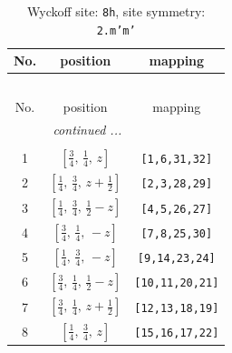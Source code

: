 \documentclass[fleqn,8pt]{jsarticle}
\begin{document}
\begin{longtable}{ccc}
\caption{Wyckoff site: {\tt 8h}, site symmetry: {\tt 2.m'm'}}
 \\
 \hline \hline
No. & position & mapping \\ \hline \endfirsthead

\multicolumn{2}{l}{\tablename\ \thetable{}} \\
 \hline \hline
No. & position & mapping \\ \hline \endhead

 \hline \hline
\multicolumn{2}{r}{\footnotesize\it continued ...} \\ \endfoot

 \hline \hline
\multicolumn{2}{r}{} \\ \endlastfoot

1 & $\left[ \frac{3}{4},\, \frac{1}{4},\, z \right]$ & {\tt [1,6,31,32]} \\ \hline
2 & $\left[ \frac{1}{4},\, \frac{3}{4},\, z + \frac{1}{2} \right]$ & {\tt [2,3,28,29]} \\ \hline
3 & $\left[ \frac{1}{4},\, \frac{3}{4},\, \frac{1}{2} - z \right]$ & {\tt [4,5,26,27]} \\ \hline
4 & $\left[ \frac{3}{4},\, \frac{1}{4},\, - z \right]$ & {\tt [7,8,25,30]} \\ \hline
5 & $\left[ \frac{1}{4},\, \frac{3}{4},\, - z \right]$ & {\tt [9,14,23,24]} \\ \hline
6 & $\left[ \frac{3}{4},\, \frac{1}{4},\, \frac{1}{2} - z \right]$ & {\tt [10,11,20,21]} \\ \hline
7 & $\left[ \frac{3}{4},\, \frac{1}{4},\, z + \frac{1}{2} \right]$ & {\tt [12,13,18,19]} \\ \hline
8 & $\left[ \frac{1}{4},\, \frac{3}{4},\, z \right]$ & {\tt [15,16,17,22]} \\
\end{longtable}
\renewcommand{\arraystretch}{1.2}
\end{document}
